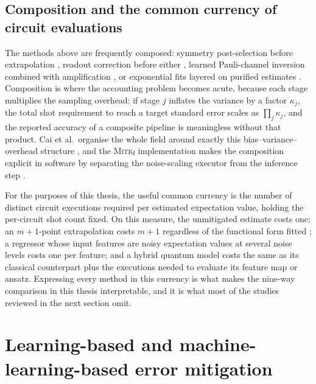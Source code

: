 \documentclass[Thesis.tex]{subfiles}
\begin{document}
\subsection{Composition and the common currency of circuit evaluations}

The methods above are frequently composed: symmetry post-selection before
extrapolation \cite{bonetmonroig2018symmetry}, readout correction before
either \cite{nation2021scalable}, learned Pauli-channel inversion combined
with amplification \cite{kim2023utility}, or exponential fits layered on
purified estimates \cite{huggins2021virtual}. Composition is where the
accounting problem becomes acute, because each stage multiplies the sampling
overhead: if stage $j$ inflates the variance by a factor $\kappa_{j}$, the
total shot requirement to reach a target standard error scales as
$\prod_{j}\kappa_{j}$, and the reported accuracy of a composite pipeline is
meaningless without that product. Cai et al.\ organise the whole field around
exactly this bias--variance--overhead structure \cite{cai2023review}, and the
\textsc{Mitiq} implementation makes the composition explicit in software by
separating the noise-scaling executor from the inference step
\cite{larose2022mitiq}.

For the purposes of this thesis, the useful common currency is the number of
distinct circuit executions required per estimated expectation value, holding
the per-circuit shot count fixed. On this measure, the unmitigated estimate
costs one; an $m+1$-point extrapolation costs $m+1$ regardless of the
functional form fitted \cite{endo2018practical,cai2021multiexponential}; a
regressor whose input features are noisy expectation values at several noise
levels costs one per feature; and a hybrid quantum model costs the same as its
classical counterpart plus the executions needed to evaluate its feature map
or ansatz. Expressing every method in this currency is what makes the nine-way
comparison in this thesis interpretable, and it is what most of the studies
reviewed in the next section omit.

\section{Learning-based and machine-learning-based error mitigation}\label{sec2:mlqem}
\end{document}
